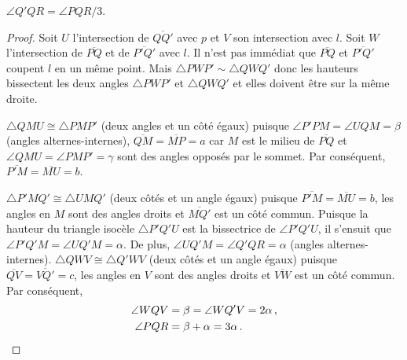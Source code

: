 \begin{theorem}
$\angle Q'QR=\angle PQR/3$.
\end{theorem}
\begin{proof}
Soit $U$ l'intersection de $\overline{QQ'}$ avec $p$ et $V$ son intersection avec $l$. Soit $W$ l'intersection de $\overline{PQ}$ et de $\overline{P'Q'}$ avec $l$. Il n'est pas immédiat que $\overline{PQ}$ et $\overline{P'Q'}$ coupent $l$ en un même point. Mais $\triangle PWP' \sim \triangle QWQ'$ donc les hauteurs bissectent les deux angles $\triangle PWP'$ et $\triangle QWQ'$ et elles doivent être sur la même droite.

$\triangle QMU\cong \triangle PMP'$  (deux angles et un côté égaux)  puisque  $\angle P'PM=\angle UQM=\beta$ (angles alternes-internes), $\overline{QM}=\overline{MP}=a$ car $M$ est le milieu de $\overline{PQ}$ et $\angle QMU=\angle PMP'=\gamma$ sont des angles opposés par le sommet. Par conséquent,  $\overline{P'M}=\overline{MU}=b$.


$\triangle P'MQ'\cong \triangle UMQ'$ (deux côtés et un angle égaux) puisque  $\overline{P'M}=\overline{MU}=b$, les angles en $M$ sont des angles droits et $\overline{MQ'}$ est un côté commun. Puisque la hauteur du triangle isocèle $\triangle P'Q'U$ est la bissectrice de $\angle P'Q'U$, il s'ensuit que $\angle P'Q'M=\angle UQ'M=\alpha$. De plus, $\angle UQ'M=\angle Q'QR=\alpha$ (angles  alternes-internes). $\triangle QWV\cong\triangle Q'WV$ (deux côtés et un  angle égaux) puisque $\overline{QV}=\overline{VQ'}=c$, les angles en $V$ sont des angles droits et $\overline{VW}$ est un côté commun. Par conséquent,
\begin{align*}
\angle WQV&=\beta=\angle WQ'V=2\alpha\,,\\
\angle PQR &= \beta + \alpha = 3\alpha\,.\qedhere
\end{align*}
\end{proof}

